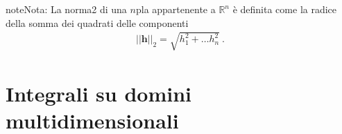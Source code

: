 \documentclass[letterpaper,10pt,italian]{jupyterBook}
\begin{document}
\begin{sphinxadmonition}{note}{Nota:}
\sphinxAtStartPar
{}
La norma\sphinxhyphen{}2 di una \(n\)\sphinxhyphen{}pla appartenente a \(\mathbb{R}^n\) è definita come la radice della somma dei quadrati delle componenti
\begin{equation*}
\begin{split}||\mathbf{h}||_{2} = \sqrt{h_1^2 + \dots h_n^2} \ .\end{split}
\end{equation*}\end{sphinxadmonition}

\sphinxstepscope


\section{Integrali su domini multi\sphinxhyphen{}dimensionali}
\label{\detokenize{ch/multivariable-calculus/integrals:integrali-su-domini-multi-dimensionali}}\label{\detokenize{ch/multivariable-calculus/integrals:multivariable-calculus-integrals}}\label{\detokenize{ch/multivariable-calculus/integrals::doc}}
\end{document}
